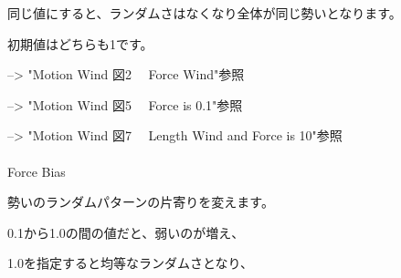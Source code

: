 \documentclass[a4paper,12pt]{article}
\begin{document}
同じ値にすると、ランダムさはなくなり全体が同じ勢いとなります。\par
初期値はどちらも1です。\par
--> "Motion Wind 図2 \ \ Force Wind"参照\par
--> "Motion Wind 図5 \ \ Force is 0.1"参照\par
--> "Motion Wind 図7 \ \ Length Wind and Force is 10"参照\\
\\
Force Bias\par
勢いのランダムパターンの片寄りを変えます。\par
0.1から1.0の間の値だと、弱いのが増え、\par
1.0を指定すると均等なランダムさとなり、

\newpage

\thispagestyle{empty}
\end{document}
